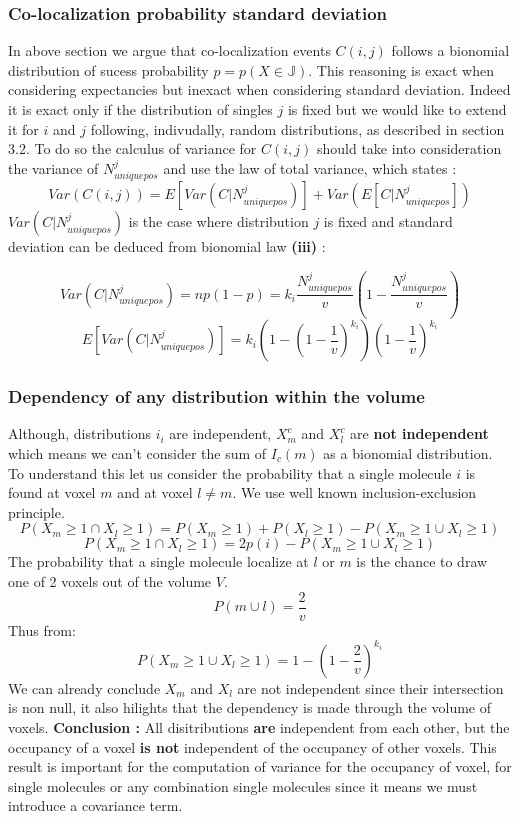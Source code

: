 \documentclass{article}
\begin{document}
\subsubsection{Co-localization probability standard deviation}

In above section we argue that co-localization events $C(i,j)$ follows a bionomial distribution of sucess probability $ p = p(X \in \mathbb{J})$.
This reasoning is exact when considering expectancies but inexact when considering standard deviation. Indeed it is exact only if the
distribution of singles $j$ is fixed but we would like to extend it for $i$ and $j$ following, indivudally, random distributions, as described in section
3.2. To do so the calculus of variance for $C(i,j)$ should take into consideration the variance of $N^j_{uniquepos}$ and use the law of total variance,
which states :
\[
Var(C(i,j)) = E[Var(C|N^j_{uniquepos})] + Var(E[C|N^j_{uniquepos}])
\] 
$Var(C|N^j_{uniquepos})$ is the case where distribution $j$ is fixed and standard deviation can be deduced from bionomial law \textbf{(iii)} :

\[
    Var(C|N^j_{uniquepos}) = np(1-p) = k_i \frac{N^j_{uniquepos}}{v}(1-\frac{N^j_{uniquepos}}{v})
\]
\[
    E[Var(C|N^j_{uniquepos})] = k_i(1-(1-\frac{1}{v})^{k_i})(1-\frac{1}{v})^{k_i}
\]

\subsubsection{Dependency of any distribution within the volume}

Although, distributions $i_i$ are independent, $X^c_m$ and $X^c_l$ are \textbf{not independent} which means we can't consider the sum of $I_c(m)$ as a
bionomial distribution. To understand this let us consider the probability that a single molecule $i$ is found at voxel $m$ and at voxel $l \neq m$.
We use well known inclusion-exclusion principle.
\[
P(X_m \geq 1 \cap X_l \geq 1) = P(X_m \geq 1) + P(X_l \geq 1) - P(X_m\geq 1 \cup X_l\geq 1)
\]
\[
P(X_m \geq 1 \cap X_l \geq 1) = 2p(i) - P(X_m\geq 1 \cup X_l\geq 1)
\]
The probability that a single molecule localize at $l$ or $m$ is the chance to draw one of 2 voxels out of the volume $V$.
\[
P(m \cup l) = \frac{2}{v}
\]
Thus from:
\[
P({X_m\geq 1 \cup X_l\geq 1}) = 1 - (1-\frac{2}{v})^{k_i} 
\]
We can already conclude $X_m$ and $X_l$ are not independent since their intersection is non null, it also hilights that the dependency is made through
the volume of voxels. \newline
\linebreak
\textbf{Conclusion : }All disitributions \textbf{are} independent from each other, but the occupancy of a voxel \textbf{is not} independent of the
occupancy of other voxels. This result is important for the computation of variance for the occupancy of voxel, for single molecules or any combination
single molecules since it means we must introduce a covariance term.
\end{document}
